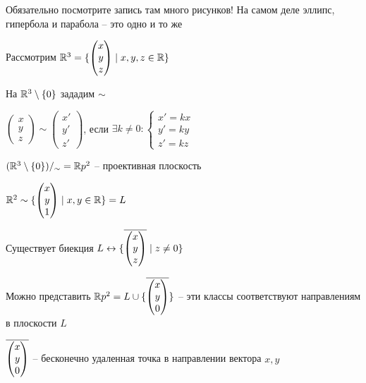 \documentclass[12pt]{article}
\begin{document}
\begin{nota}{Обязательно посмотрите запись там много рисунков!}
    На самом деле эллипс, гипербола и парабола -- это одно и то же 

    Рассмотрим $\mathbb R^3 = \{ \begin{pmatrix}
        x \\
        y \\
        z 
    \end{pmatrix} \mid x, y, z \in \mathbb R \}$

    На $\mathbb R^3 \setminus \{0\}$ зададим $\sim$

    $\begin{pmatrix}
        x \\
        y \\
        z 
    \end{pmatrix} \sim \begin{pmatrix}
        x' \\
        y' \\
        z'
    \end{pmatrix}$, если $\exists k \neq 0 : \begin{cases}
        x' = kx \\
        y' = ky \\
        z' = kz
    \end{cases}$

    $(\mathbb R^3 \setminus \{0\})/_{\sim} = \mathbb R p^2$ -- проективная плоскость

    $\mathbb R^2 \sim \{ \begin{pmatrix}
        x \\
        y \\
        1
    \end{pmatrix} \mid x, y \in \mathbb R \} = L$

    Существует биекция $L \leftrightarrow \{ \overline{\begin{pmatrix}
        x \\
        y \\
        z 
    \end{pmatrix}} \mid z \neq 0 \}$

    Можно представить $\mathbb R p^2 = L \cup \{ \overline{\begin{pmatrix}
        x \\
        y \\
        0
    \end{pmatrix}}\}$ -- эти классы соответствуют направлениям в плоскости $L$

    $\overline{\begin{pmatrix}
        x \\
        y \\
        0
    \end{pmatrix}}$ -- бесконечно удаленная точка в направлении вектора $x, y$
\end{nota}
\end{document}
